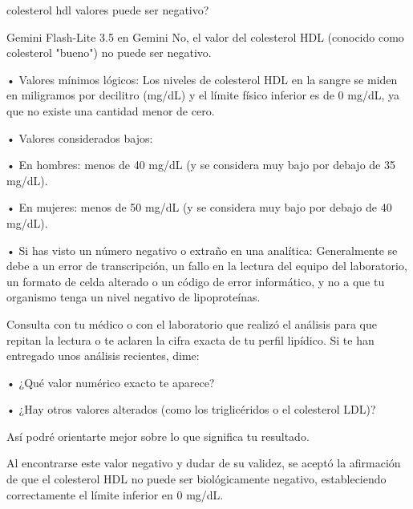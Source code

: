 \documentclass[12pt,a4paper,oneside]{book}
\begin{document}
\begin{iaprompt}
colesterol hdl valores puede ser negativo?
\end{iaprompt}
\begin{iaresp}{Gemini Flash-Lite 3.5 en Gemini}
No, el valor del colesterol HDL (conocido como colesterol "bueno") no puede ser negativo.

• Valores mínimos lógicos: Los niveles de colesterol HDL en la sangre se miden en miligramos por decilitro (mg/dL) y el límite físico inferior es de 0 mg/dL, ya que no existe una cantidad menor de cero.

• Valores considerados bajos:

	• En hombres: menos de 40 mg/dL (y se considera muy bajo por debajo de 35 mg/dL).
    
	• En mujeres: menos de 50 mg/dL (y se considera muy bajo por debajo de 40 mg/dL).
    
• Si has visto un número negativo o extraño en una analítica: Generalmente se debe a un error de transcripción, un fallo en la lectura del equipo del laboratorio, un formato de celda alterado o un código de error informático, y no a que tu organismo tenga un nivel negativo de lipoproteínas.

Consulta con tu médico o con el laboratorio que realizó el análisis para que repitan la lectura o te aclaren la cifra exacta de tu perfil lipídico.
Si te han entregado unos análisis recientes, dime:

• ¿Qué valor numérico exacto te aparece?

• ¿Hay otros valores alterados (como los triglicéridos o el colesterol LDL)?

Así podré orientarte mejor sobre lo que significa tu resultado.
\end{iaresp}
\begin{iaanalisis}
Al encontrarse este valor negativo y dudar de su validez, se aceptó la afirmación de que el colesterol HDL no puede ser biológicamente negativo, estableciendo correctamente el límite inferior en 0 mg/dL.
\end{iaanalisis}
\end{document}
